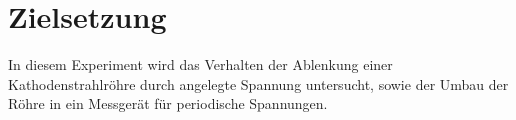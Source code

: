 \section{Zielsetzung}
\label{sec:Zielsetzung}


In diesem Experiment wird das Verhalten der Ablenkung einer Kathodenstrahlröhre durch angelegte Spannung untersucht, sowie der Umbau der Röhre in ein Messgerät für periodische Spannungen.